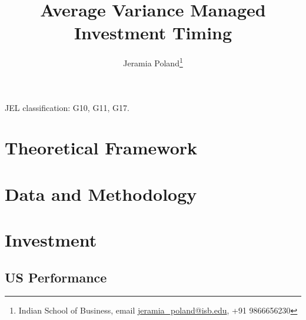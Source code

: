 \documentclass[11pt]{article}
\begin{document}
\onehalfspacing      %

\author{Jeramia Poland\thanks{\rm Indian School of Business, email \href{mailto:jeramia_poland@isb.edu}{jeramia\_poland@isb.edu}, +91 9866656230 \newline
		\protect } }

\title{\Large \bf Average Variance Managed Investment Timing}

\date{}              %


\maketitle
\thispagestyle{empty}

\bigskip



\medskip

\noindent JEL classification: G10, G11, G17.

\clearpage

%



\section{Theoretical Framework} \label{sec:theory}



\section{Data and Methodology} \label{sec:Data}



\section{Investment} \label{sec:asset_allocation}



\subsection{US Performance} \label{sec:port_performance}
\end{document}
